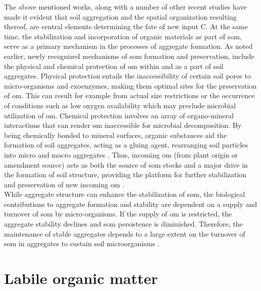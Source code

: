 	The above mentioned works, along with a  number of other recent studies have made it evident that soil aggregation and the spatial organization resulting thereof, are central elements determining the fate of new input C. At the same time, the stabilization and incorporation of organic materials as part of \gls{som}, serve as a primary mechanism in the processes of aggregate formation. As noted earlier, newly recognized mechanisms of \gls{som} formation and preservation, include the physical and chemical protection of \gls{om} within and as a part of soil aggregates. Physical protection entails the inaccessibility of certain soil pores to micro-organisms and exoenzymes, making them optimal sites for the preservation of \gls{om}. This can result for example from actual size restrictions or the occurrence of conditions such as low oxygen availability which may preclude microbial utilization of \gls{om}. Chemical protection involves an array of organo-mineral interactions that can render \gls{om} inaccessible for microbial decomposition. By being chemically bonded to mineral surfaces, organic substances aid the formation of soil aggregates, acting as a gluing agent, rearranging soil particles into micro and macro aggregates \citep{six2002}. Thus, incoming \gls{om} (from plant origin or amendment source) acts as both the source of \gls{som} stocks and a major drive in the formation of soil structure, providing the platform for further stabilization and preservation of new incoming \gls{om} \citep{mccarthy2008}.\\
	While aggregate structure can enhance the stabilization of \gls{som}, the biological contributions to aggregate formation and stability are dependent on a supply and turnover of \gls{som} by micro-organisms. If the supply of \gls{om} is restricted, the aggregate stability declines and \gls{som} persistence is diminished. Therefore, the maintenance of stable aggregates  depends to a large extent on the turnover of \gls{som} in aggregates to sustain soil microorganisms \citep{dungait2012, golchin1994}.

\section{Labile organic matter}

